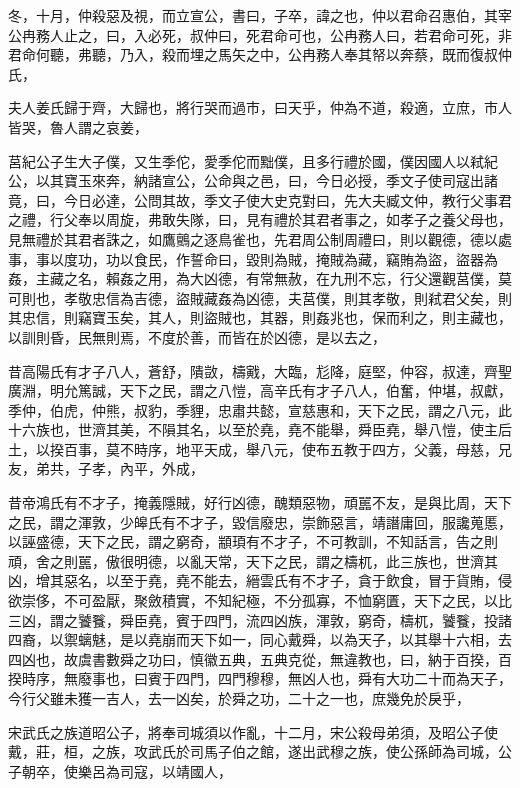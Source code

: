 \documentclass{ctexart}
\begin{document}
冬，十月，仲殺惡及視，而立宣公，書曰，子卒，諱之也，仲以君命召惠伯，其宰公冉務人止之，曰，入必死，叔仲曰，死君命可也，公冉務人曰，若君命可死，非君命何聽，弗聽，乃入，殺而埋之馬矢之中，公冉務人奉其帑以奔蔡，既而復叔仲氏，

夫人姜氏歸于齊，大歸也，將行哭而過市，曰天乎，仲為不道，殺適，立庶，市人皆哭，魯人謂之哀姜，

莒紀公子生大子僕，又生季佗，愛季佗而黜僕，且多行禮於國，僕因國人以弒紀公，以其寶玉來奔，納諸宣公，公命與之邑，曰，今日必授，季文子使司寇出諸竟，曰，今日必達，公問其故，季文子使大史克對曰，先大夫臧文仲，教行父事君之禮，行父奉以周旋，弗敢失隊，曰，見有禮於其君者事之，如孝子之養父母也，見無禮於其君者誅之，如鷹鸇之逐鳥雀也，先君周公制周禮曰，則以觀德，德以處事，事以度功，功以食民，作誓命曰，毀則為賊，掩賊為藏，竊賄為盜，盜器為姦，主藏之名，賴姦之用，為大凶德，有常無赦，在九刑不忘，行父還觀莒僕，莫可則也，孝敬忠信為吉德，盜賊藏姦為凶德，夫莒僕，則其孝敬，則弒君父矣，則其忠信，則竊寶玉矣，其人，則盜賊也，其器，則姦兆也，保而利之，則主藏也，以訓則昏，民無則焉，不度於善，而皆在於凶德，是以去之，

昔高陽氏有才子八人，蒼舒，隤敳，檮戭，大臨，尨降，庭堅，仲容，叔達，齊聖廣淵，明允篤誠，天下之民，謂之八愷，高辛氏有才子八人，伯奮，仲堪，叔獻，季仲，伯虎，仲熊，叔豹，季貍，忠肅共懿，宣慈惠和，天下之民，謂之八元，此十六族也，世濟其美，不隕其名，以至於堯，堯不能舉，舜臣堯，舉八愷，使主后土，以揆百事，莫不時序，地平天成，舉八元，使布五教于四方，父義，母慈，兄友，弟共，子孝，內平，外成，

昔帝鴻氏有不才子，掩義隱賊，好行凶德，醜類惡物，頑嚚不友，是與比周，天下之民，謂之渾敦，少皞氏有不才子，毀信廢忠，崇飾惡言，靖譖庸回，服讒蒐慝，以誣盛德，天下之民，謂之窮奇，顓頊有不才子，不可教訓，不知話言，告之則頑，舍之則嚚，傲很明德，以亂天常，天下之民，謂之檮杌，此三族也，世濟其凶，增其惡名，以至于堯，堯不能去，縉雲氏有不才子，貪于飲食，冒于貨賄，侵欲崇侈，不可盈厭，聚斂積實，不知紀極，不分孤寡，不恤窮匱，天下之民，以比三凶，謂之饕餮，舜臣堯，賓于四門，流四凶族，渾敦，窮奇，檮杌，饕餮，投諸四裔，以禦螭魅，是以堯崩而天下如一，同心戴舜，以為天子，以其舉十六相，去四凶也，故虞書數舜之功曰，慎徽五典，五典克從，無違教也，曰，納于百揆，百揆時序，無廢事也，曰賓于四門，四門穆穆，無凶人也，舜有大功二十而為天子，今行父雖未獲一吉人，去一凶矣，於舜之功，二十之一也，庶幾免於戾乎，

宋武氏之族道昭公子，將奉司城須以作亂，十二月，宋公殺母弟須，及昭公子使戴，莊，桓，之族，攻武氏於司馬子伯之館，遂出武穆之族，使公孫師為司城，公子朝卒，使樂呂為司寇，以靖國人，
\end{document}
